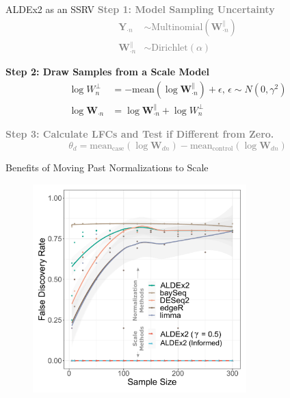 \documentclass[
  ignorenonframetext,
]{beamer}
\begin{document}
\begin{frame}{ALDEx2 as an SSRV}
\protect\hypertarget{aldex2-as-an-ssrv}{}
\textcolor{gray}{\textbf{Step 1: Model Sampling Uncertainty}}
\textcolor{gray}{\begin{align*}
\mathbf{Y}_{\cdot n} &\sim \text{Multinomial}(\mathbf{W}_{\cdot n}^\parallel)\\
\mathbf{W}_{\cdot n}^\parallel &\sim \text{Dirichlet}(\alpha)
\end{align*}}

\textbf{Step 2: Draw Samples from a Scale Model} \begin{align*}
\log W_{n}^\perp &=- \text{mean}(\log \mathbf{W}_{\cdot n}^\parallel) + \epsilon, \, \epsilon \sim N(0,\gamma^2)\\
\log \mathbf{W}_{\cdot n} &= \log \mathbf{W}_{\cdot n}^\parallel + \log W_{n}^\perp
\end{align*}

\textcolor{gray}{\textbf{Step 3: Calculate LFCs and Test if Different from Zero.}}
\textcolor{gray}{\begin{equation*}
\theta_d = \text{mean}_{\text{case}}(\log \mathbf{W}_{dn}) - \text{mean}_{\text{control}}(\log \mathbf{W}_{dn})
  \end{equation*}}
\end{frame}

\begin{frame}{Benefits of Moving Past Normalizations to Scale}
\protect\hypertarget{benefits-of-moving-past-normalizations-to-scale}{}
\begin{figure}
  \centering
  \includegraphics[width=3.25in]{figures/sim-res-samples.pdf}
\end{figure}
\end{frame}
\end{document}
